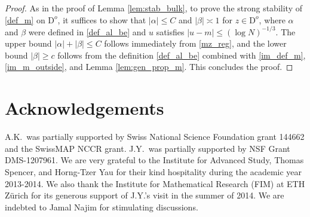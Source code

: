 \documentclass[11pt]{article} %
\numberwithin{equation}{section}
\numberwithin{figure}{section}
\theoremstyle{plain} %
\theoremstyle{definition} %
\newcommand{\f}[1]{\boldsymbol{\mathrm{#1}}} %
\renewcommand{\leq}{\leqslant}
\renewcommand{\geq}{\geqslant}
\newcommand{\abs}[1]{\lvert #1 \rvert}
\begin{document}
\begin{proof}
As in the proof of Lemma \ref{lem:stab_bulk}, to prove the strong stability of \eqref{def_m} on $\f D^o$, it suffices to show that $\abs{\alpha} \leq C$ and $\abs{\beta} \asymp 1$ for $z \in \f D^o$, where $\alpha$ and $\beta$ were defined in \eqref{def_al_be} and $u$ satisfies $\abs{u - m} \leq (\log N)^{-1/3}$. The upper bound $\abs{\alpha} + \abs{\beta} \leq C$ follows immediately from \eqref{mz_reg}, and the lower bound $\abs{\beta} \geq c$ follows from the definition \eqref{def_al_be} combined with \eqref{im_def_m}, \eqref{im_m_outside}, and Lemma \ref{lem:gen_prop_m}. This concludes the proof.
\end{proof}



\section*{Acknowledgements}
A.K.\ was partially supported by Swiss National Science Foundation grant 144662 and the SwissMAP NCCR grant. J.Y.\ was partially supported by NSF Grant DMS-1207961. We are very grateful to the Institute for Advanced Study, Thomas Spencer, and Horng-Tzer Yau for their kind hospitality during the academic year 2013-2014. We also thank the Institute for Mathematical Research (FIM) at ETH Z\"urich for its generous support of J.Y.'s visit in the summer of 2014. We are indebted to Jamal Najim for stimulating discussions.
\end{document}
